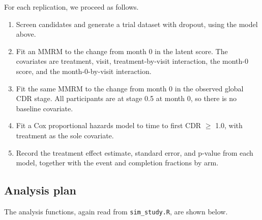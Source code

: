 \documentclass[
  11pt,
]{article}
\providecommand{\tightlist}{%
  \setlength{\itemsep}{0pt}\setlength{\parskip}{0pt}}
\begin{document}
For each replication, we proceed as follows.

\begin{enumerate}
\def\labelenumi{\arabic{enumi}.}
\tightlist
\item
  Screen candidates and generate a trial dataset with
  dropout, using the model above.
\item
  Fit an MMRM to the change from month 0 in the latent
  score. The covariates are treatment, visit,
  treatment-by-visit interaction, the month-0 score, and
  the month-0-by-visit interaction.
\item
  Fit the same MMRM to the change from month 0 in the
  observed global CDR stage. All participants are at
  stage 0.5 at month 0, so there is no baseline covariate.
\item
  Fit a Cox proportional hazards model to time to first
  CDR \(\geq\) 1.0, with treatment as the sole covariate.
\item
  Record the treatment effect estimate, standard error,
  and p-value from each model, together with the event
  and completion fractions by arm.
\end{enumerate}

\subsection{Analysis plan}\label{analysis-plan}

The analysis functions, again read from \texttt{sim\_study.R}, are
shown below.
\end{document}
